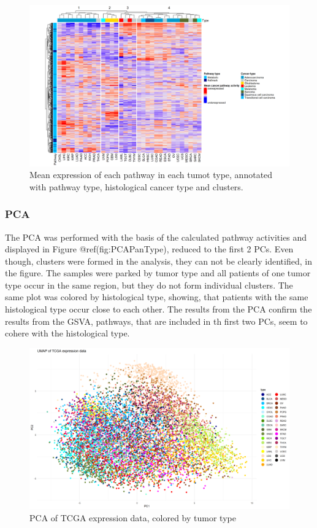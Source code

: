 \documentclass[
  parskip,
  oneside]{scrreprt}
\begin{document}
\begin{figure}

{\centering \includegraphics[width=0.5\linewidth]{figures/Pan Cancer mean expression} 

}

\caption{Mean expression of each pathway in each tumot type, annotated with pathway type, histological cancer type and clusters.}\label{fig:meanexp}
\end{figure}

\hypertarget{pca}{%
\subsubsection{PCA}\label{pca}}

The PCA was performed with the basis of the calculated pathway
activities and displayed in Figure @ref(fig:PCAPanType), reduced to the
first 2 PCs. Even though, clusters were formed in the analysis, they can
not be clearly identified, in the figure. The samples were parked by
tumor type and all patients of one tumor type occur in the same region,
but they do not form individual clusters. The same plot was colored by
histological type, showing, that patients with the same histological
type occur close to each other. The results from the PCA confirm the
results from the GSVA, pathways, that are included in th first two PCs,
seem to cohere with the histological type.

\begin{figure}

{\centering \includegraphics[width=0.75\linewidth]{figures/Pan Cancer PCA PC1und2} 

}

\caption{PCA of TCGA expression data, colored by tumor type}\label{fig:PCAPanType}
\end{figure}
\end{document}

